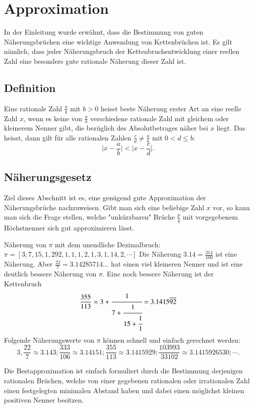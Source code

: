 %
%
%
\section{Approximation
\label{kettenbruch:section:Approximation}}

In der Einleitung wurde erwähnt, dass die Bestimmung von guten
Näherungsbrüchen eine wichtige Anwendung von Kettenbrüchen ist. Es
gilt nämlich, dass jeder Näherungsbruch der Kettenbruchentwicklung
einer reellen Zahl eine besonders gute rationale Näherung dieser
Zahl ist.

\subsection{Definition}

Eine rationale Zahl $\frac{a}{b}$ mit $b>0$ heisst beste Näherung
erster Art an eine reelle Zahl $x$, wenn es keine von $\frac{a}{b}$
verschiedene rationale Zahl mit gleichem oder kleinerem Nenner gibt,
die bezüglich des Absolutbetrages näher bei $x$ liegt.
Das heisst, dann gilt für alle rationalen Zahlen $\frac{c}{d} \ne
\frac{a}{b}$ mit $0<d\le b$:
\begin{equation}
\biggl|x-\frac{a}{b}\biggr| < \biggl| x-\frac{c}{d}\biggr|.
\end{equation}

\subsection{Näherungsgesetz}
Ziel dieses Abschnitt ist es, eine genügend gute Approximation der
Näherungsbrüche nachzuweisen. Gibt man sich eine beliebige Zahl $x$
vor, so kann man sich die Frage stellen, welche "unkürzbaren" Brüche
$\frac{p}{q}$ mit vorgegebenem Höchstnenner sich gut approximieren
lässt.

\begin{beispiel}
Näherung von $\pi$ mit dem unendliche Dezimalbruch:
$\pi = [3;7,15,1,292,1,1,1,2,1,3,1,14,2,\cdots]$
Die Näherung $3.14 = \frac{314}{100}$ ist eine Näherung. Aber
$\frac{22}{7} = 3.14285714\dots$ hat einen viel kleineren Nenner und
ist eine deutlich bessere Näherung von $\pi$.
Eine noch bessere Näherung ist der Kettenbruch
\begin{equation}
\frac{355}{113} = 3 + \cfrac{1}{7+\cfrac{1}{15+\cfrac{1}{1}}} = 3.1415\overline{92}
\end{equation}
Folgende Näherungswerte von $\pi$ können schnell und einfach gerechnet werden:
\begin{equation}
3,\frac{22}{7} \approx 3.143 ; \frac{333}{106} \approx 3.14151 ; \frac{355}{113} 
\approx 3.1415929 ; \frac{103993}{33102} \approx 3.1415926530 ; \cdots.
\end{equation}
\end{beispiel}
Die Bestapproximation ist einfach formuliert durch die Bestimmung
derjenigen rationalen Brüchen, welche von einer gegebenen rationalen
oder irrationalen Zahl einen festgelegten minimalen Abstand haben
und dabei einen möglichst kleinen positiven Nenner besitzen.

